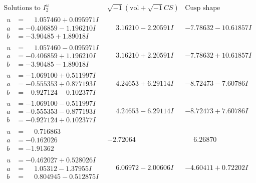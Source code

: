 \documentclass[1p]{elsarticle_modified}
\theoremstyle{definition}
\newcommand{\I}{\sqrt{-1}}
\begin{document}
$$\begin{array}{c|c|c}  
\text{Solutions to }I^u_{2}& \I (\text{vol} + \sqrt{-1}CS) & \text{Cusp shape}\\
 \hline 
\begin{aligned}
u &= \phantom{-}1.057460 + 0.095971 I \\
a &= -0.406859 - 1.196210 I \\
b &= -3.90485 + 1.89018 I\end{aligned}
 & \phantom{-}3.16210 - 2.20591 I & -7.78632 - 10.61857 I \\ \hline\begin{aligned}
u &= \phantom{-}1.057460 - 0.095971 I \\
a &= -0.406859 + 1.196210 I \\
b &= -3.90485 - 1.89018 I\end{aligned}
 & \phantom{-}3.16210 + 2.20591 I & -7.78632 + 10.61857 I \\ \hline\begin{aligned}
u &= -1.069100 + 0.511997 I \\
a &= -0.555353 + 0.877193 I \\
b &= -0.927124 - 0.102377 I\end{aligned}
 & \phantom{-}4.24653 + 6.29114 I & -8.72473 - 7.60786 I \\ \hline\begin{aligned}
u &= -1.069100 - 0.511997 I \\
a &= -0.555353 - 0.877193 I \\
b &= -0.927124 + 0.102377 I\end{aligned}
 & \phantom{-}4.24653 - 6.29114 I & -8.72473 + 7.60786 I \\ \hline\begin{aligned}
u &= \phantom{-}0.716863\phantom{ +0.000000I} \\
a &= -0.162026\phantom{ +0.000000I} \\
b &= -1.91362\phantom{ +0.000000I}\end{aligned}
 & -2.72064\phantom{ +0.000000I} & \phantom{-}6.26870\phantom{ +0.000000I} \\ \hline\begin{aligned}
u &= -0.462027 + 0.528026 I \\
a &= \phantom{-}1.05312 - 1.37955 I \\
b &= \phantom{-}0.804945 - 0.512875 I\end{aligned}
 & \phantom{-}6.06972 - 2.00606 I & -4.60411 + 0.72202 I \\ \hline\begin{aligned}

\end{aligned}
\end{array}$$
\end{document}

